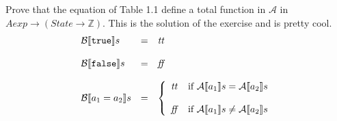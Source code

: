 \documentclass[
10pt, %
a4paper, %
oneside, %
headinclude,footinclude, %
BCOR5mm, %
]{scrartcl}
\begin{document}
\maketitle 
\setcounter{tocdepth}{3} 
\setcounter{secnumdepth}{0}
\tableofcontents 

\newpage 

{Prove that the equation of Table 1.1 define a total function in $\mathcal{A}$ in $Aexp \rightarrow (State \rightarrow \mathbb{Z})$.}
{
 This is the solution of the exercise and is pretty cool.
  $$
  \begin{array}{lll}
  \B{\syntrue} & = & \semtrue \\
  & & \\
  \B{\synfalse} & = & \semfalse \\ 
  & & \\
  \B{a_1 = a_2} & = & \caseFun{\semtrue}{\A{a_1} = \A{a_2}}{\semfalse}{\A{a_1} \neq \A{a_2}}\\
  \end{array}
  $$
}
\end{document}
